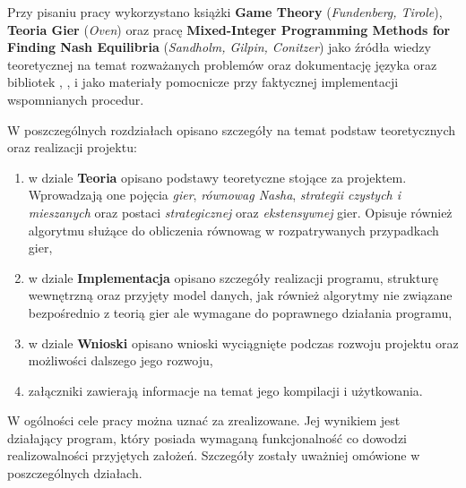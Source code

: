 \documentclass{standalone}
\begin{document}
Przy pisaniu pracy wykorzystano książki \textbf{Game Theory} (\textit{Fundenberg, Tirole}), \textbf{Teoria Gier} (\textit{Oven}) oraz pracę
\textbf{Mixed-Integer Programming Methods for Finding Nash Equilibria} (\textit{Sandholm, Gilpin, Conitzer}) jako źródła wiedzy teoretycznej
na temat rozważanych problemów oraz dokumentację języka  oraz bibliotek , ,  i  jako materiały
pomocnicze przy faktycznej implementacji wspomnianych procedur.

W poszczególnych rozdziałach opisano szczegóły na temat podstaw teoretycznych oraz realizacji projektu:
\begin{enumerate}
\item w dziale \textbf{Teoria} opisano podstawy teoretyczne stojące za projektem. Wprowadzają one pojęcia \textit{gier}, \textit{równowag Nasha},
\textit{strategii czystych i mieszanych} oraz postaci \textit{strategicznej} oraz \textit{ekstensywnej} gier. Opisuje również algorytmu służące do
obliczenia równowag w rozpatrywanych przypadkach gier,
\item w dziale \textbf{Implementacja} opisano szczegóły realizacji programu, strukturę wewnętrzną oraz przyjęty model danych, jak również algorytmy
nie związane bezpośrednio z teorią gier ale wymagane do poprawnego działania programu,
\item w dziale \textbf{Wnioski} opisano wnioski wyciągnięte podczas rozwoju projektu oraz możliwości dalszego jego rozwoju,
\item załączniki zawierają informacje na temat jego kompilacji i użytkowania.
\end{enumerate}

W ogólności cele pracy można uznać za zrealizowane. Jej wynikiem jest działający program, który posiada wymaganą funkcjonalność co dowodzi realizowalności
przyjętych założeń. Szczegóły zostały uważniej omówione w poszczególnych działach.
\end{document}

